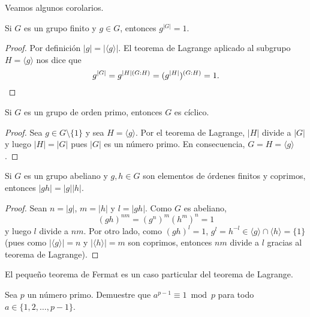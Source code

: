 Veamos algunos corolarios. 

\begin{corollary}
	Si $G$ es un grupo finito y $g\in G$, entonces $g^{|G|}=1$. 	
\end{corollary}

\begin{proof}
	Por definición $|g|=|\langle g\rangle|$. El teorema de Lagrange aplicado al
	subgrupo $H=\langle g\rangle$ nos dice que 
	\[
		g^{|G|}=g^{|H|(G:H)}=(g^{|H|})^{(G:H)}=1.\qedhere
	\]
\end{proof}

\begin{corollary}
	Si $G$ es un grupo de orden primo, entonces $G$ es cíclico.
\end{corollary}

\begin{proof}
	Sea $g\in G\setminus\{1\}$ y sea $H=\langle g\rangle$. Por el teorema de
	Lagrange, $|H|$ divide a $|G|$ y luego $|H|=|G|$ pues $|G|$ es un número
	primo. En consecuencia, $G=H=\langle g\rangle$. 
\end{proof}

\begin{corollary}
\label{cor:ordenes_coprimos}
	Si $G$ es un grupo abeliano y $g,h\in G$ son elementos de órdenes finitos y coprimos, entonces
	$|gh|=|g||h|$.
\end{corollary}

\begin{proof}
Sean $n=|g|$, $m=|h|$ y $l=|gh|$. Como $G$ es abeliano, 
\[
(gh)^{nm}=(g^n)^m(h^m)^n=1
\]
y luego $l$ divide a $nm$. Por otro lado, como $(gh)^l=1$, 
$g^l=h^{-l}\in \langle g\rangle\cap\langle h\rangle=\{1\}$ (pues como $|\langle g\rangle|=n$ y $|\langle h\rangle|=m$ son coprimos, 
entonces $nm$ divide a $l$ gracias al teorema de Lagrange). 
\end{proof}


El pequeño teorema de Fermat es un caso particular del teorema de Lagrange.

\begin{exercise}
	Sea $p$ un número primo. Demuestre que 
	$a^{p-1}\equiv1\bmod p$  
	para todo $a\in\{1,2,\dots,p-1\}$. 
\end{exercise}

